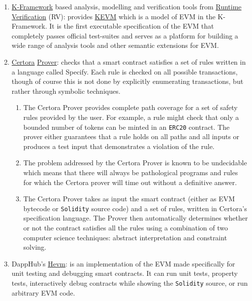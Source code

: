 \begin{enumerate}
\item\href{https://kframework.org/}{K-Framework} based analysis, modelling and verification tools from \href{https://runtimeverification.com/smartcontract/}{Runtime Verification} (RV): provides \href{https://github.com/kframework/evm-semantics}{KEVM} which is a model of EVM in the K-Framework. It is the first executable specification of the EVM that completely passes official test-suites and serves as a platform for building a wide range of analysis tools and other semantic extensions for EVM.

\item\href{https://www.certora.com}{Certora} \href{https://www.certora.com/pubs/QuickGuide.pdf}{Prover}: checks that a smart contract satisfies a set of rules written in a language called Specify. Each rule is checked on all possible transactions, though of course this is not done by explicitly enumerating transactions, but rather through symbolic techniques.
	\begin{enumerate}
	\item The Certora Prover provides complete path coverage for a set of safety rules provided by the user. For example, a rule might check that only a bounded number of tokens can be minted in an \verb|ERC20| contract. The prover either guarantees that a rule holds on all paths and all inputs or produces a test input that demonstrates a violation of the rule.
	\item The problem addressed by the Certora Prover is known to be undecidable which means that there will always be pathological programs and rules for which the Certora prover will time out without a definitive answer.
	\item The Certora Prover takes as input the smart contract (either as EVM bytecode or \verb|Solidity| source code) and a set of rules, written in Certora’s specification language. The Prover then automatically determines whether or not the contract satisfies all the rules using a combination of two computer science techniques: abstract interpretation and constraint solving.
	\end{enumerate}

\item DappHub’s \href{http://dapp.tools/hevm/}{Hevm}: is an implementation of the EVM made specifically for unit testing and debugging smart contracts. It can run unit tests, property tests, interactively debug contracts while showing the \verb|Solidity| source, or run arbitrary EVM code.


\end{enumerate}
